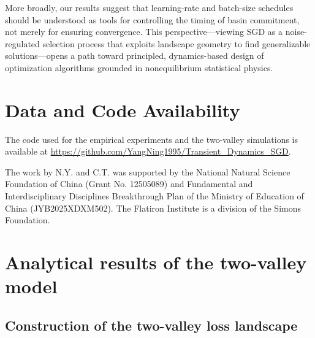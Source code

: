\documentclass[aps,prx,reprint,superscriptaddress,longbibliography,nofootinbib,floatfix]{revtex4-2}
\begin{document}
More broadly, our results suggest that learning-rate and batch-size schedules should be understood as tools for controlling the timing of basin commitment, not merely for ensuring convergence. This perspective---viewing SGD as a noise-regulated selection process that exploits landscape geometry to find generalizable solutions---opens a path toward principled, dynamics-based design of optimization algorithms grounded in nonequilibrium statistical physics.

\section*{Data and Code Availability}
The code used for the empirical experiments and the two-valley simulations is available at
\url{https://github.com/YangNing1995/Transient_Dynamics_SGD}.

\begin{acknowledgments}
The work by N.Y. and C.T. was supported by the National Natural Science Foundation of China (Grant No. 12505089) and Fundamental and Interdisciplinary Disciplines Breakthrough Plan of the Ministry of Education of China (JYB2025XDXM502). The Flatiron Institute is a division of the Simons Foundation.
\end{acknowledgments}

\appendix

\setcounter{equation}{0}
\renewcommand{\theequation}{A\arabic{equation}}

\section{Analytical results of the two-valley model}

\subsection{Construction of the two-valley loss landscape} \label{sec:appendix0}
\end{document}
